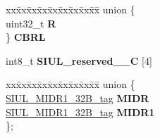 \begin{DoxyCompactItemize}
\begin{tabbing}
\end{tabbing}\item 
\mbox{\label{structSIU__tag_a562bd23a03a260eb4dc68241fee889b2}} 
\begin{tabbing}
xx\=xx\=xx\=xx\=xx\=xx\=xx\=xx\=xx\=\kill
union \{\\
\>uint32\_t {\bfseries R}\\
\} {\bfseries CBRL}\\

\end{tabbing}\item 
\mbox{\label{structSIU__tag_ae447f2e800d21b7fea716b8b64459535}} 
int8\+\_\+t {\bfseries S\+I\+U\+L\+\_\+reserved\+\_\+\_\+C} \mbox{[}4\mbox{]}
\item 
\mbox{\label{structSIU__tag_a7bf48ad92e585d50df468329c87aaa39}} 
\begin{tabbing}
xx\=xx\=xx\=xx\=xx\=xx\=xx\=xx\=xx\=\kill
union \{\\
\>\mbox{\hyperlink{unionSIUL__MIDR1__32B__tag}{SIUL\_MIDR1\_32B\_tag}} {\bfseries MIDR}\\
\>\mbox{\hyperlink{unionSIUL__MIDR1__32B__tag}{SIUL\_MIDR1\_32B\_tag}} {\bfseries MIDR1}\\
\}; \\


\end{tabbing}
\end{DoxyCompactItemize}
